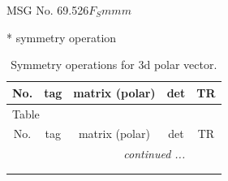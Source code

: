 \documentclass[fleqn,8pt]{jsarticle}
\begin{document}
\setcounter{MaxMatrixCols}{32}

\renewcommand{\tablename}{Table~}
\renewcommand{\figurename}{Figure~}
\begin{center}
\LARGE
MSG No. 69.526\quad$F_{S}mmm$
\end{center}
* symmetry operation
\renewcommand{\arraystretch}{1.3}
\begin{longtable}{ccccc}
\caption{Symmetry operations for 3d polar vector.}
 \\
 \hline \hline
No. & tag & matrix (polar) & det & TR \\ \hline \endfirsthead

\multicolumn{4}{l}{\tablename\ \thetable{}} \\
 \hline \hline
No. & tag & matrix (polar) & det & TR \\ \hline \endhead

 \hline \hline
\multicolumn{4}{r}{\footnotesize\it continued ...} \\ \endfoot

 \hline \hline
\multicolumn{4}{r}{} \\ \endlastfoot


\end{longtable}
\end{document}
